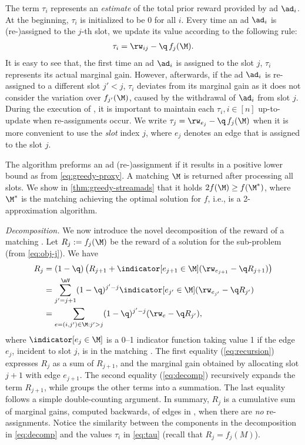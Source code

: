 The term $\tau_i$ represents an \emph{estimate} of the total prior reward provided by ad $\ad_i$.
At the beginning, $\tau_i$ is initialized to be 0 for all $i$.
Every time an ad $\ad_i$ is (re-)assigned to the $j$-th slot,
we update its value according to the following rule:
\begin{align}
	\tau_i = \rw_{ij} - \q \, f_j(\M). \label{eq:tau}
\end{align}
It is easy to see that, 
the first time an ad $\ad_i$ is assigned to the slot $j$,
$\tau_i$ represents its actual marginal gain.
However, afterwards, if the ad $\ad_i$ is re-assigned to a different slot $j'<j$,
$\tau_i$ deviates from its marginal gain 
as it does not consider the variation over
$f_{j'}(\M)$, 
caused by the withdrawal of $\ad_i$ from slot $j$.
During the execution of \alggbackproxy, 
it is important to maintain each $\tau_i, i\in[n]$ 
up-to-update when re-assignments occur.
We write $\tau_{j} = \rw_{e_{j}} - \q \, f_j(\M)$ 
when it is more convenient to use the \emph{slot} index $j$,
where $e_j$ denotes an edge that is assigned to the slot $j$.

The \alggbackproxy algorithm preforms an ad (re-)assignment if it results in a positive lower bound as from \cref{eq:greedy-proxy}.
A matching $\M$ is returned after processing all slots. 
We show in \cref{thm:greedy-streamads} that it holds $2 f(\M) \ge f(\M^*)$, where $\M^*$ is the matching achieving the optimal solution for $f$, i.e., \alggbackproxy is a 2-approximation algorithm.


\smallskip
\noindent
\emph{Decomposition.}
We now introduce the novel decomposition of the reward of a matching \M.
Let $R_j := f_j(\M)$ be the reward of a solution \M for the \streamadsj sub-problem (from \cref{eq:obj-j}).
We have
\begin{align}
	R_j 
	&= (1-\q) \left( R_{j+1} + \indicator[e_{j+1} \in \M] (\rw_{e_{j+1}} - \q R_{j+1}) \right) \label{eq:recursion}\\
	&= \sum_{j'=j+1}^{\nV}  (1-\q)^{j'-j} \indicator[e_{j'} \in \M] (\rw_{e_{j'}} - \q R_{j'}) \label{eq:decomp} \\
	&= \sum_{e=(i,j') \in \M: j' > j}  (1-\q)^{j'-j} (\rw_{e} - \q R_{j'}) \nonumber
	,
\end{align}
where $\indicator[e_j \in \M]$ is a 0--1 indicator function taking value 1 if the edge $e_j$, incident to slot $j$, is in the matching \M.
The first equality (\cref{eq:recursion}) expresses $R_j$ as a sum of $R_{j+1}$, and the marginal gain obtained by allocating slot $j+1$ with edge $e_{j+1}$.
The second equality (\cref{eq:decomp}) recursively expands the term $R_{j+1}$, while groups the other terms into a summation. %
The last equality follows 
a simple double-counting argument. %
In summary, $R_j$ is a cumulative sum of marginal gains, computed backwards, of edges in \M,
when there are \emph{no} re-assignments.
Notice the similarity between the components in the decomposition in \cref{eq:decomp}
and the values $\tau_i$ in \cref{eq:tau} (recall that $R_j = f_j(M)$).

